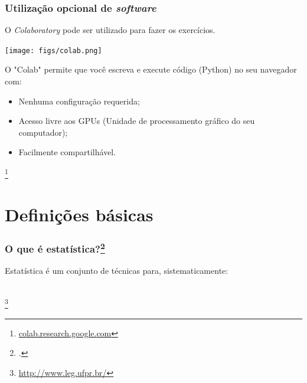 \documentclass[11pt]{beamer}
\newcommand\blfootnote[1]{%
  \begingroup
  \renewcommand\thefootnote{}\footnote{#1}%
  \addtocounter{footnote}{-1}%
  \endgroup
}
\begin{document}
\begin{frame}
\frametitle{Utilização opcional de \textit{software}}
O \textit{Colaboratory} pode ser utilizado para fazer os exercícios.

\begin{center}\texttt{[image: figs/colab.png]} \end{center}

O "Colab" permite que você escreva e execute código (Python) no seu navegador com:
\begin{itemize}
\item Nenhuma configuração requerida;
\item Acesso livre aos GPUs (Unidade de processamento gráfico do seu computador);
\item Facilmente compartilhável.
\end{itemize} 

\blfootnote{\url{colab.research.google.com}}
\end{frame}


\section{Definições básicas}
\begin{frame}
\frametitle{O que é estatística?\footcite{magalhaes2002noccoes}}
Estatística é um conjunto de técnicas para, sistematicamente:
\\~\\
  \begin{itemize}
  \end{itemize}
\blfootnote{\url{http://www.leg.ufpr.br/}}
\end{frame}
\end{document}
